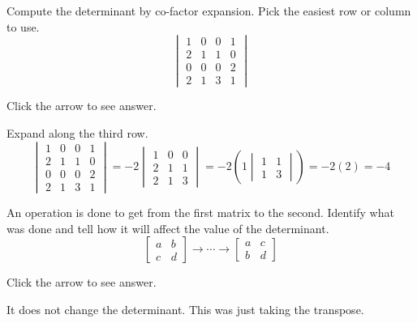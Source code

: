 \documentclass{ximera}
\begin{document}
\begin{problem}\label{prb:7.7} Compute the determinant by co-factor expansion. Pick the easiest row or
column to use.
$$\begin{vmatrix}
1 & 0 & 0 & 1 \\
2 & 1 & 1 & 0 \\
0 & 0 & 0 & 2 \\
2 & 1 & 3 & 1
\end{vmatrix}$$

Click the arrow to see answer.
\begin{expandable}
Expand along the third row.
$$\begin{vmatrix}
1 & 0 & 0 & 1 \\
2 & 1 & 1 & 0 \\
0 & 0 & 0 & 2 \\
2 & 1 & 3 & 1
\end{vmatrix}=-2\begin{vmatrix}
    1 & 0 & 0\\2 & 1 & 1\\2 & 1 & 3
\end{vmatrix}=-2\left(1\begin{vmatrix}
    1 & 1\\1 & 3
\end{vmatrix}\right)=-2(2)=-4$$
\end{expandable}
\end{problem}

\begin{problem}\label{prb:7.9} An operation is done to get from the first matrix to the second.
Identify what was done and tell how it will affect the value of the
determinant.
\begin{equation*}
\left[
\begin{array}{cc}
a & b \\
c & d
\end{array}
\right]  \rightarrow \cdots \rightarrow \left[
\begin{array}{cc}
a & c \\
b & d
\end{array}
\right]
\end{equation*}

Click the arrow to see answer.
\begin{expandable}
It does not change the determinant. This was just taking the transpose.
\end{expandable}
\end{problem}
\end{document}
